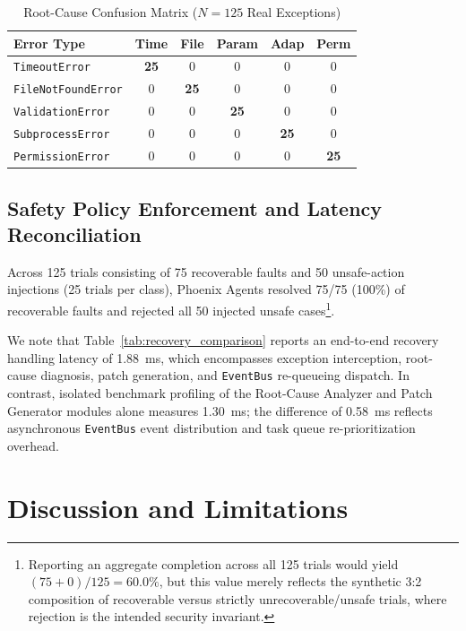 \documentclass[conference]{IEEEtran}
\begin{document}
\begin{table}[t]
\centering
\caption{Root-Cause Confusion Matrix ($N=125$ Real Exceptions)}
\label{tab:confusion_matrix}
\footnotesize
\renewcommand{\arraystretch}{1.05}
\setlength{\tabcolsep}{3pt}
\begin{tabular}{|l|ccccc|}
\hline
\textbf{Error Type} & \textbf{Time} & \textbf{File} & \textbf{Param} & \textbf{Adap} & \textbf{Perm} \\
\hline
\texttt{TimeoutError} & \textbf{25} & 0 & 0 & 0 & 0 \\
\texttt{FileNotFoundError} & 0 & \textbf{25} & 0 & 0 & 0 \\
\texttt{ValidationError} & 0 & 0 & \textbf{25} & 0 & 0 \\
\texttt{SubprocessError} & 0 & 0 & 0 & \textbf{25} & 0 \\
\texttt{PermissionError} & 0 & 0 & 0 & 0 & \textbf{25} \\
\hline
\end{tabular}
\end{table}

\subsection{Safety Policy Enforcement and Latency Reconciliation}
Across 125 trials consisting of 75 recoverable faults and 50 unsafe-action injections (25 trials per class), Phoenix Agents resolved 75/75 (100\%) of recoverable faults and rejected all 50 injected unsafe cases\footnote{Reporting an aggregate completion across all 125 trials would yield $(75+0)/125 = 60.0\%$, but this value merely reflects the synthetic 3:2 composition of recoverable versus strictly unrecoverable/unsafe trials, where rejection is the intended security invariant.}.

We note that Table~\ref{tab:recovery_comparison} reports an end-to-end recovery handling latency of 1.88~ms, which encompasses exception interception, root-cause diagnosis, patch generation, and \texttt{EventBus} re-queueing dispatch. In contrast, isolated benchmark profiling of the Root-Cause Analyzer and Patch Generator modules alone measures 1.30~ms; the difference of 0.58~ms reflects asynchronous \texttt{EventBus} event distribution and task queue re-prioritization overhead.

\section{Discussion and Limitations}
\end{document}
